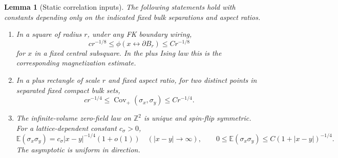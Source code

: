 \documentclass[11pt]{article}
\newtheorem{lemma}[theorem]{Lemma}
\theoremstyle{definition}
\theoremstyle{remark}
\numberwithin{equation}{section}
\begin{document}
\begin{lemma}[Static correlation inputs]\label{fd:static-correlations}
The following statements hold with constants depending only on the indicated
fixed bulk separations and aspect ratios.
\begin{enumerate}
\item In a square of radius \(r\), under any FK boundary wiring,
\[
 c r^{-1/8}\le
 \phi(x\longleftrightarrow\partial B_r)
 \le C r^{-1/8}
\]
for \(x\) in a fixed central subsquare.  In the plus Ising law this is
the corresponding magnetization estimate.
\item In a plus rectangle of scale \(r\) and fixed aspect ratio, for two
distinct points in separated fixed compact bulk sets,
\[
 c r^{-1/4}\le\operatorname{Cov}_+(\sigma_x,\sigma_y)
 \le C r^{-1/4}.
\]
\item The infinite-volume zero-field law on \(\mathbb Z^2\) is unique and
spin-flip symmetric.  For a lattice-dependent constant \(c_\sigma>0\),
\[
 \mathbb E(\sigma_x\sigma_y)
   =c_\sigma |x-y|^{-1/4}(1+o(1))
       \quad (|x-y|\longrightarrow\infty),
 \qquad
 0\le\mathbb E(\sigma_x\sigma_y)
       \le C(1+|x-y|)^{-1/4}.
\]
The asymptotic is uniform in direction.
\end{enumerate}
\end{lemma}
\end{document}
